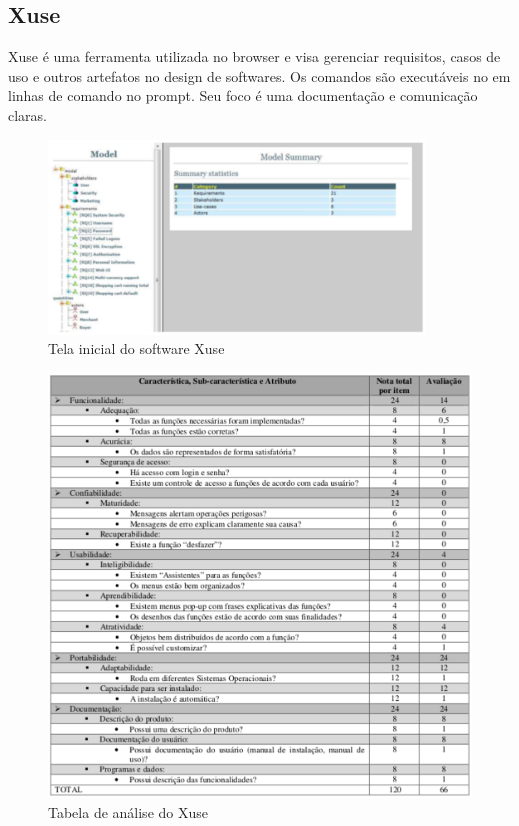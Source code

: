 \subsection{Xuse}

  Xuse é uma ferramenta utilizada no browser e visa gerenciar requisitos, casos de uso e outros artefatos no design de softwares.
  Os comandos são executáveis no em linhas de comando no prompt. Seu foco é uma documentação e comunicação claras.

  \begin{figure}[!h]
    \centering
    \includegraphics[width=10cm, keepaspectratio=true]{figuras/ferramentas/xuse1.eps}
    \caption{Tela inicial do software Xuse}
  \end{figure}

  \begin{figure}[!h]
    \centering
    \includegraphics[width=12cm, keepaspectratio=true]{figuras/ferramentas/xuse2.eps}
    \caption{Tabela de análise do Xuse}
  \end{figure}

